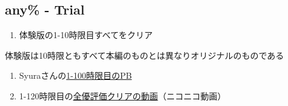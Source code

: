 \subsection{any\% - Trial}
\begin{enumerate}[label={\sarrow}]
\item 体験版の1-10時限目すべてをクリア
\end{enumerate}
\begin{marker}
体験版は10時限ともすべて本編のものとは異なりオリジナルのものである
\end{marker}



\begin{enumerate}[label={\sarrow}]
\item Syuraさんの\href{https://pastebin.com/0nH3mJSZ}{1-100時限目のPB}
\item 1-120時限目の\href{https://www.nicovideo.jp/watch/sm18710850}{全優評価クリアの動画}（ニコニコ動画）
\end{enumerate}



